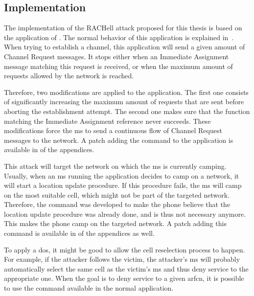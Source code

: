       \subsection{Implementation}
      \label{sec:rachell_impl}

      The implementation of the RACHell attack proposed for this thesis
      is based on the  application of . The
      normal behavior of this application is explained
      in~. When trying to establish a channel, this
      application will send a given amount of Channel Request messages.
      It stops either when an Immediate Assignment message matching this
      request is received, or when the maximum amount of requests
      allowed by the network is reached.       

      Therefore, two modifications are applied to the 
      application. The first one consists of significantly increasing
      the maximum amount of requests that are sent before aborting the
      establishment attempt. The second one makes sure that the function
      matching the Immediate Assignment reference never succeeds. These
      modifications force the \gls{ms} to send a continuous flow of
      Channel Request messages to the network. A patch adding the
       command to the  application is
      available in  of the appendices.

      This attack will target the network on which the \gls{ms} is
      currently camping. Usually, when an \gls{ms} running the
       application decides to camp on a network, it will
      start a location update procedure. If this procedure fails, the
      \gls{ms} will camp on the most suitable cell, which might not be
      part of the targeted network. Therefore, the 
      command was developed to make the phone believe that the location
      update procedure was already done, and is thus not necessary
      anymore. This makes the phone camp on the targeted network. A
      patch adding this command is available in  of
      the appendices as well.

      To apply a \gls{dos}, it might be good to allow the cell
      reselection process to happen. For example, if the attacker
      follows the victim, the attacker's \gls{ms} will probably
      automatically select the same cell as the victim's \gls{ms} and
      thus deny service to the appropriate one. When the goal is to deny
      service to a given \gls{arfcn}, it is possible to use the
       command available in the normal 
      application.

